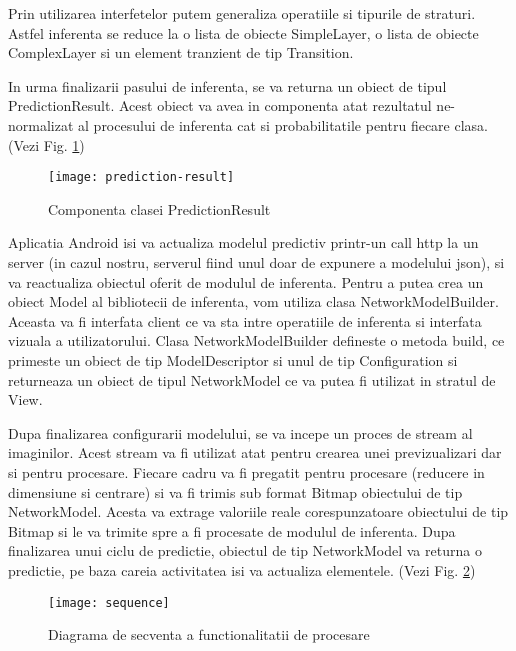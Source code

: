 	Prin utilizarea interfetelor putem generaliza operatiile si tipurile de straturi. Astfel inferenta se reduce la o lista de obiecte SimpleLayer, o lista de obiecte ComplexLayer si un element tranzient de tip Transition.
	
	In urma finalizarii pasului de inferenta, se va returna un obiect de tipul PredictionResult. Acest obiect va avea in componenta atat rezultatul ne-normalizat al procesului de inferenta cat si probabilitatile pentru fiecare clasa.(Vezi Fig. \ref{fig:prediction-result})
	
	\begin{figure}[H]
		\texttt{[image: prediction-result]}
		\caption{\label{fig:prediction-result} Componenta clasei PredictionResult}
	\end{figure}
	
	\vfill
	
	Aplicatia Android isi va actualiza modelul predictiv printr-un call http la un server (in cazul nostru, serverul fiind unul doar de expunere a modelului json), si va reactualiza obiectul oferit de modulul de inferenta. Pentru a putea crea un obiect Model al bibliotecii de inferenta, vom utiliza clasa NetworkModelBuilder. Aceasta va fi interfata client ce va sta intre operatiile de inferenta si interfata vizuala a utilizatorului. Clasa NetworkModelBuilder defineste o metoda build, ce primeste un obiect de tip ModelDescriptor si unul de tip Configuration si returneaza un obiect de tipul NetworkModel ce va putea fi utilizat in stratul de View. 
	
	\newpage
	
	Dupa finalizarea configurarii modelului, se va incepe un proces de stream al imaginilor. Acest stream va fi utilizat atat pentru crearea unei previzualizari dar si pentru procesare. Fiecare cadru va fi pregatit pentru procesare (reducere in dimensiune si centrare) si va fi trimis sub format Bitmap obiectului de tip NetworkModel. 
	Acesta va extrage valoriile reale corespunzatoare obiectului de tip Bitmap si le va trimite spre a fi procesate de modulul de inferenta. Dupa finalizarea unui ciclu de predictie, obiectul de tip NetworkModel va returna o predictie, pe baza careia activitatea isi va actualiza elementele.
	(Vezi Fig. \ref{fig:prediction-sequence})\newline
	
	\begin{figure}[H]
		\texttt{[image: sequence]}
		\caption{\label{fig:prediction-sequence} Diagrama de secventa a functionalitatii de procesare}
	\end{figure}	
	
